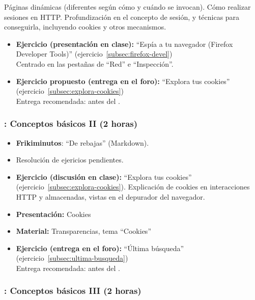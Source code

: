 \documentclass[a4paper,12pt]{article}
\begin{document}
Páginas dinámicas (diferentes según cómo y cuándo se invocan). Cómo realizar sesiones en HTTP. Profundización en el concepto de sesión, y técnicas para conseguirla, incluyendo cookies y otros mecanismos.

\begin{itemize}
\item \textbf{Ejercicio (presentación en clase):} ``Espía a tu navegador (Firefox Developer Tools)'' (ejercicio~\ref{subsec:firefox-devel}) \\
  Centrado en las pestañas de ``Red'' e ``Inspección''.
\item \textbf{Ejercicio propuesto (entrega en el foro):} ``Explora tus cookies'' (ejercicio~\ref{subsec:explora-cookies}) \\
  Entrega recomendada: antes del \lunesB.
\end{itemize}


\subsubsection{\lunesB: Conceptos básicos II (2 horas)}
\label{cal:lunesB}

\begin{itemize}
\item \textbf{Frikiminutos}: ``De rebajas'' (Markdown).
\item Resolución de ejericios pendientes.
\item \textbf{Ejercicio (discusión en clase):}  ``Explora tus cookies'' (ejercicio~\ref{subsec:explora-cookies}).
  Explicación de cookies en interacciones HTTP y almacenadas, vistas en el depurador del navegador.
\item \textbf{Presentación:} Cookies
\item \textbf{Material:} Transparencias, tema ``Cookies''
\item \textbf{Ejercicio (entrega en el foro):} ``Última búsqueda'' (ejercicio~\ref{subsec:ultima-busqueda}) \\
  Entrega recomendada: antes del \lunesC. \\
\end{itemize}


\subsubsection{\lunesC: Conceptos básicos III (2 horas)}
\label{cal:lunesC}
\end{document}
